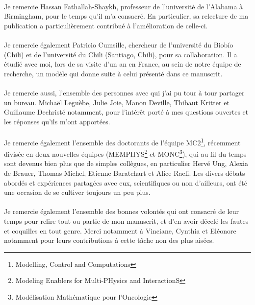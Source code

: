 \paragraph{}
Je remercie Hassan Fathallah-Shaykh, professeur de l'université de l'Alabama à Birmingham, pour le temps qu'il m'a consacré. En particulier, sa relecture de ma publication a particulièrement contribué  à l'amélioration de celle-ci.

\paragraph{}
Je remercie également Patricio Cumsille, chercheur de l'université du Biobío (Chili) et de l'université du Chili (Santiago, Chili), pour sa collaboration. Il a étudié avec moi, lors de sa visite d'un an en France, au sein de notre équipe de recherche, un modèle qui donne suite à celui présenté dans ce manuscrit. 

\paragraph{}
Je remercie aussi, l'ensemble des personnes avec qui j'ai pu tour à tour partager un bureau. Michaël Leguèbe, Julie Joie, Manon Deville, Thibaut Kritter et Guillaume Dechristé notamment, pour l'intérêt porté à mes questions ouvertes et les réponses qu'ils m'ont apportées.

\paragraph{}
Je remercie également l'ensemble des doctorants de l'équipe MC2\footnote{Modelling, Control and Computations}, récemment divisée en deux nouvelles équipes (MEMPHYS\footnote{Modeling Enablers for Multi-PHysics and InteractionS} et MONC\footnote{Modélisation Mathématique pour l'Oncologie}), qui au fil du temps sont devenus bien plus que de simples collègues, en particulier Hervé Ung, Alexia de Brauer, Thomas Michel, Etienne Baratchart et Alice Raeli. Les divers débats abordés et expériences partagées avec eux, scientifiques ou non d'ailleurs, ont été une occasion de se cultiver toujours un peu plus.

\paragraph{}
Je remercie également l'ensemble des bonnes volontés qui ont consacré de leur temps pour relire tout ou partie de mon manuscrit, et d'en avoir décelé les fautes et coquilles en tout genre. 
Merci notamment à Vinciane, Cynthia et Eléonore notamment pour leurs contributions à cette tâche non des plus aisées.

